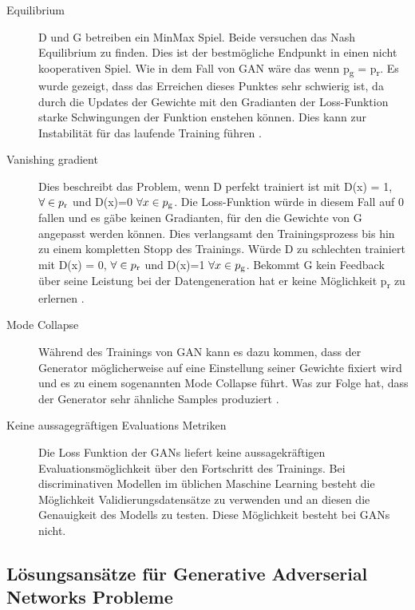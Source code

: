 \documentclass{llncs}
\begin{document}
\begin{description}	

\item[Equilibrium]
D und G betreiben ein MinMax Spiel. Beide versuchen das Nash Equilibrium zu finden. Dies ist der bestmögliche Endpunkt in einen nicht kooperativen Spiel. Wie in dem Fall von GAN wäre das wenn  p\textsubscript{g} = p\textsubscript{r}. Es wurde gezeigt, dass das Erreichen dieses Punktes sehr schwierig ist, da durch die Updates der Gewichte mit den Gradianten der Loss-Funktion starke Schwingungen der Funktion enstehen können. Dies kann zur Instabilität für das laufende Training führen \cite{improvingan}.   
\\
\item[Vanishing gradient]
Dies beschreibt das Problem, wenn D perfekt trainiert ist mit  D(x) = 1, $\forall \in p\textsubscript{r}$ und D(x)=0 $\forall x \in p \textsubscript{g}$. Die Loss-Funktion würde in diesem Fall auf 0 fallen und es gäbe keinen Gradianten, für den die Gewichte von G angepasst werden können. Dies verlangsamt den Trainingsprozess bis hin zu einem kompletten Stopp des Trainings. Würde D zu schlechten trainiert mit  D(x) = 0, $\forall \in p\textsubscript{r}$ und D(x)=1 $\forall x \in p \textsubscript{g}$. Bekommt G kein Feedback über seine Leistung bei der Datengeneration hat er keine Möglichkeit p\textsubscript{r} zu erlernen \cite{improvingan}.
\\
\item[Mode Collapse]
Während des Trainings von GAN kann es dazu kommen, dass der Generator möglicherweise auf eine Einstellung seiner Gewichte fixiert wird und es zu einem sogenannten Mode Collapse führt. Was zur Folge hat, dass der Generator sehr ähnliche Samples produziert \cite{wasserstein}.
\\
\item[Keine aussagegräftigen Evaluations Metriken]
Die Loss Funktion der GANs liefert keine aussagekräftigen Evaluationsmöglichkeit über den Fortschritt des Trainings. Bei  discriminativen Modellen im üblichen Maschine Learning besteht die Möglichkeit Validierungsdatensätze zu verwenden und an diesen die Genauigkeit des Modells zu testen. Diese Möglichkeit besteht bei GANs nicht\cite{metrics}.
\end{description}
\newpage

\subsection{Lösungsansätze für Generative Adverserial Networks Probleme}
\end{document}
